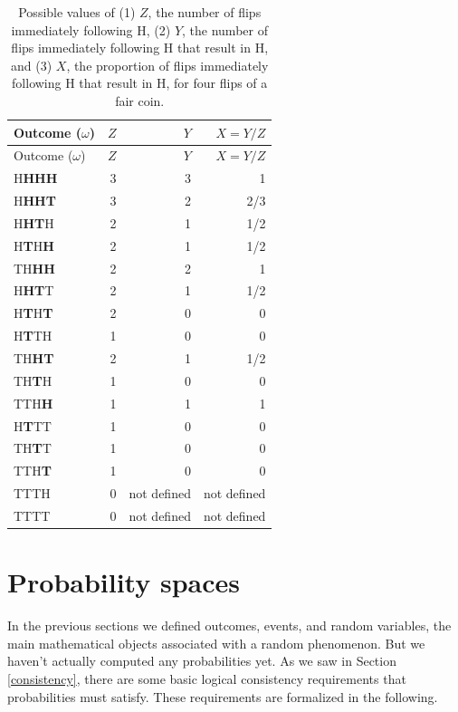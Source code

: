 \documentclass[
]{book}
\theoremstyle{definition}
\theoremstyle{definition}
\theoremstyle{definition}
\theoremstyle{remark}
\begin{document}
\begin{longtable}[]{@{}lrrr@{}}
\caption{\label{tab:mscoin} Possible values of (1) \(Z\), the number of flips immediately following H, (2) \(Y\), the number of flips immediately following H that result in H, and (3) \(X\), the proportion of flips immediately following H that result in H, for four flips of a fair coin.}\tabularnewline
\toprule
Outcome (\(\omega\)) \textbar{} & \(Z\) \textbar{} & \(Y\) \textbar{} & \(X = Y/Z\) \textbar{}\tabularnewline
\midrule
\endfirsthead
\toprule
Outcome (\(\omega\)) \textbar{} & \(Z\) \textbar{} & \(Y\) \textbar{} & \(X = Y/Z\) \textbar{}\tabularnewline
\midrule
\endhead
H\textbf{HHH} \textbar{} & 3 \textbar{} & 3 \textbar{} & 1 \textbar{}\tabularnewline
H\textbf{HHT} \textbar{} & 3 \textbar{} & 2 \textbar{} & 2/3 \textbar{}\tabularnewline
H\textbf{HT}H \textbar{} & 2 \textbar{} & 1 \textbar{} & 1/2 \textbar{}\tabularnewline
H\textbf{T}H\textbf{H} \textbar{} & 2 \textbar{} & 1 \textbar{} & 1/2 \textbar{}\tabularnewline
TH\textbf{HH} \textbar{} & 2 \textbar{} & 2 \textbar{} & 1 \textbar{}\tabularnewline
H\textbf{HT}T \textbar{} & 2 \textbar{} & 1 \textbar{} & 1/2 \textbar{}\tabularnewline
H\textbf{T}H\textbf{T} \textbar{} & 2 \textbar{} & 0 \textbar{} & 0 \textbar{}\tabularnewline
H\textbf{T}TH \textbar{} & 1 \textbar{} & 0 \textbar{} & 0 \textbar{}\tabularnewline
TH\textbf{HT} \textbar{} & 2 \textbar{} & 1 \textbar{} & 1/2 \textbar{}\tabularnewline
TH\textbf{T}H \textbar{} & 1 \textbar{} & 0 \textbar{} & 0 \textbar{}\tabularnewline
TTH\textbf{H} \textbar{} & 1 \textbar{} & 1 \textbar{} & 1 \textbar{}\tabularnewline
H\textbf{T}TT \textbar{} & 1 \textbar{} & 0 \textbar{} & 0 \textbar{}\tabularnewline
TH\textbf{T}T \textbar{} & 1 \textbar{} & 0 \textbar{} & 0 \textbar{}\tabularnewline
TTH\textbf{T} \textbar{} & 1 \textbar{} & 0 \textbar{} & 0 \textbar{}\tabularnewline
TTTH \textbar{} & 0 \textbar{} & not defined \textbar{} & not defined \textbar{}\tabularnewline
TTTT \textbar{} & 0 \textbar{} & not defined \textbar{} & not defined \textbar{}\tabularnewline
\bottomrule
\end{longtable}

\hypertarget{probspace}{%
\section{Probability spaces}\label{probspace}}

In the previous sections we defined outcomes, events, and random variables, the main mathematical objects associated with a random phenomenon. But we haven't actually computed any probabilities yet. As we saw in Section \ref{consistency}, there are some basic logical consistency requirements that probabilities must satisfy. These requirements are formalized in the following.
\end{document}
